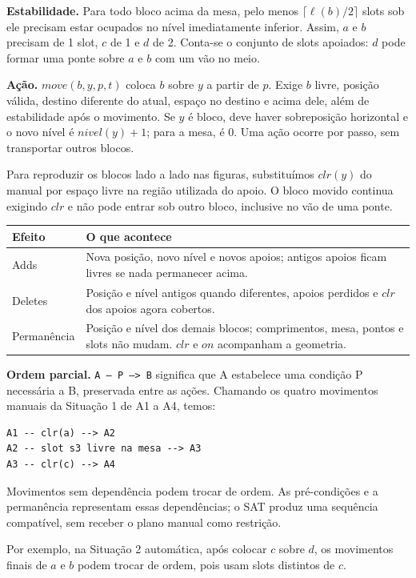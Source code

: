 \documentclass[11pt,a4paper]{article}
\newcommand{\code}[1]{\texttt{#1}}
\begin{document}
\textbf{Estabilidade.} Para todo bloco acima da mesa, pelo menos $\lceil\ell(b)/2\rceil$ slots sob ele precisam estar ocupados no nível imediatamente inferior. Assim, $a$ e $b$ precisam de 1 slot, $c$ de 1 e $d$ de 2. Conta-se o conjunto de slots apoiados: $d$ pode formar uma ponte sobre $a$ e $b$ com um vão no meio.

\textbf{Ação.} $move(b,y,p,t)$ coloca $b$ sobre $y$ a partir de $p$. Exige $b$ livre, posição válida, destino diferente do atual, espaço no destino e acima dele, além de estabilidade após o movimento. Se $y$ é bloco, deve haver sobreposição horizontal e o novo nível é $nivel(y)+1$; para a mesa, é 0. Uma ação ocorre por passo, sem transportar outros blocos.

Para reproduzir os blocos lado a lado nas figuras, substituímos $clr(y)$ do manual por espaço livre na região utilizada do apoio. O bloco movido continua exigindo $clr$ e não pode entrar sob outro bloco, inclusive no vão de uma ponte.

\newpage
\begin{tabularx}{\linewidth}{lY}
\toprule Efeito & O que acontece \\ \midrule
Adds & Nova posição, novo nível e novos apoios; antigos apoios ficam livres se nada permanecer acima.\\
Deletes & Posição e nível antigos quando diferentes, apoios perdidos e $clr$ dos apoios agora cobertos.\\
Permanência & Posição e nível dos demais blocos; comprimentos, mesa, pontos e slots não mudam. $clr$ e $on$ acompanham a geometria.\\ \bottomrule
\end{tabularx}

\textbf{Ordem parcial.} \code{A -- P --> B} significa que A estabelece uma condição P necessária a B, preservada entre as ações. Chamando os quatro movimentos manuais da Situação 1 de A1 a A4, temos:
\begin{lstlisting}
A1 -- clr(a) --> A2
A2 -- slot s3 livre na mesa --> A3
A3 -- clr(c) --> A4
\end{lstlisting}
Movimentos sem dependência podem trocar de ordem. As pré-condições e a permanência representam essas dependências; o SAT produz uma sequência compatível, sem receber o plano manual como restrição.

Por exemplo, na Situação 2 automática, após colocar $c$ sobre $d$, os movimentos finais de $a$ e $b$ podem trocar de ordem, pois usam slots distintos de $c$.
\end{document}
